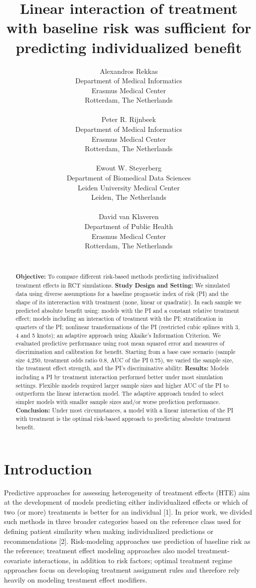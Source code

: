 \documentclass{article}
\title{Linear interaction of treatment with baseline risk was sufficient
for predicting individualized benefit}
\author{
    Alexandros Rekkas
   \\
    Department of Medical Informatics \\
    Erasmus Medical Center \\
  Rotterdam, The Netherlands \\
  \texttt{} \\
   \And
    Peter R. Rijnbeek
   \\
    Department of Medical Informatics \\
    Erasmus Medical Center \\
  Rotterdam, The Netherlands \\
  \texttt{} \\
   \And
    Ewout W. Steyerberg
   \\
    Department of Biomedical Data Sciences \\
    Leiden University Medical Center \\
  Leiden, The Netherlands \\
  \texttt{} \\
   \And
    David van Klaveren
   \\
    Department of Public Health \\
    Erasmus Medical Center \\
  Rotterdam, The Netherlands \\
  \texttt{} \\
  }
\date{}
\begin{document}
\maketitle

\def\tightlist{}


\begin{abstract}
\textbf{Objective:} To compare different risk-based methods predicting
individualized treatment effects in RCT simulations. \textbf{Study
Design and Setting:} We simulated data using diverse assumptions for a
baseline prognostic index of risk (PI) and the shape of its
intereraction with treatment (none, linear or quadratic). In each sample
we predicted absolute benefit using: models with the PI and a constant
relative treatment effect; models including an interaction of treatment
with the PI; stratification in quarters of the PI; nonlinear
transformations of the PI (restricted cubic splines with 3, 4 and 5
knots); an adaptive approach using Akaike's Information Criterion. We
evaluated predictive performance using root mean squared error and
measures of discrimination and calibration for benefit. Starting from a
base case scenario (sample size 4,250, treatment odds ratio 0.8, AUC of
the PI 0.75), we varied the sample size, the treatment effect strength,
and the PI's discriminative ability. \textbf{Results:} Models including
a PI by treatment interaction performed better under most simulation
settings. Flexible models required larger sample sizes and higher AUC of
the PI to outperform the linear interaction model. The adaptive approach
tended to select simpler models with smaller sample sizes and/or worse
prediction performance. \textbf{Conclusion:} Under most circumstances, a
model with a linear interaction of the PI with treatment is the optimal
risk-based approach to predicting absolute treatment benefit.
\end{abstract}


\doublespacing 
\linenumbers

\hypertarget{introduction}{%
\section{Introduction}\label{introduction}}

Predictive approaches for assessing heterogeneity of treatment effects
(HTE) aim at the development of models predicting either individualized
effects or which of two (or more) treatments is better for an individual
{[}1{]}. In prior work, we divided such methods in three broader
categories based on the reference class used for defining patient
similarity when making individualized predictions or recommendations
{[}2{]}. Risk-modeling approaches use prediction of baseline risk as the
reference; treatment effect modeling approaches also model
treatment-covariate interactions, in addition to risk factors; optimal
treatment regime approaches focus on developing treatment assignment
rules and therefore rely heavily on modeling treatment effect modifiers.
\end{document}
